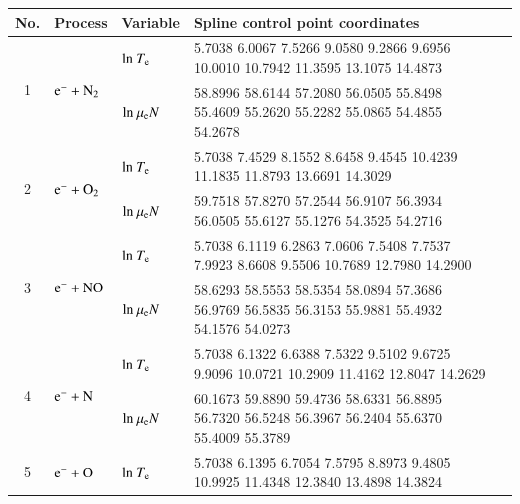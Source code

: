 \documentclass{warpdoc}
\renewcommand{\fontsizetable}{\footnotesize\scalefont{1.0}}
\begin{document}
\begin{table}[!htbp]
  \center\fontsizetable
  \begin{threeparttable}
    \label{tab:spline_tab}
    \fontsizetable
    \begin{tabular*}{\textwidth}{c@{\extracolsep{\fill}}llll}
    \toprule
   No. & Process & Variable & Spline control point coordinates  \\
        \midrule

  \multirow{2}{*}{1} &  \multirow{2}{*}{ $\rm e^- + N_2  $   } & ${\rm ln}~T_{\rm e}$  & \tiny 5.7038    6.0067    7.5266    9.0580    9.2866    9.6956   10.0010   10.7942   11.3595   13.1075   14.4873     \\
  &  & ${\rm ln}~\mu_{\rm e}N$     & \tiny  58.8996   58.6144   57.2080   56.0505   55.8498   55.4609   55.2620   55.2282   55.0865   54.4855   54.2678  \\
  \midrule  
  \multirow{2}{*}{2} &  \multirow{2}{*}{ $\rm e^- + O_2  $   } & ${\rm ln}~T_{\rm e}$  & \tiny      5.7038    7.4529    8.1552    8.6458    9.4545   10.4239   11.1835   11.8793   13.6691   14.3029\\
  &  & ${\rm ln}~\mu_{\rm e}N$     & \tiny    59.7518   57.8270   57.2544   56.9107   56.3934   56.0505   55.6127   55.1276   54.3525   54.2716  \\
  \midrule 
  \multirow{2}{*}{3} &  \multirow{2}{*}{ $\rm e^- + NO  $   } & ${\rm ln}~T_{\rm e}$  & \tiny 5.7038    6.1119    6.2863    7.0606    7.5408    7.7537    7.9923    8.6608    9.5506   10.7689   12.7980   14.2900 \\
  &  & ${\rm ln}~\mu_{\rm e}N$     & \tiny  58.6293   58.5553   58.5354   58.0894   57.3686   56.9769   56.5835   56.3153   55.9881   55.4932   54.1576   54.0273 \\
  \midrule 
  \multirow{2}{*}{4} &  \multirow{2}{*}{ $\rm e^- + N  $   } & ${\rm ln}~T_{\rm e}$  & \tiny 5.7038    6.1322    6.6388    7.5322    9.5102    9.6725    9.9096   10.0721   10.2909   11.4162   12.8047   14.2629 \\
  &  & ${\rm ln}~\mu_{\rm e}N$   & \tiny 60.1673   59.8890   59.4736   58.6331   56.8895   56.7320   56.5248   56.3967   56.2404   55.6370   55.4009   55.3789 \\     
  \midrule  
  \multirow{2}{*}{5} &  \multirow{2}{*}{ $\rm e^- + O  $   } & ${\rm ln}~T_{\rm e}$  & \tiny 5.7038    6.1395    6.7054    7.5795    8.8973    9.4805   10.9925   11.4348   12.3840   13.4898   14.3824 \\

\end{tabular*}
\end{threeparttable}
\end{table}
\end{document}
